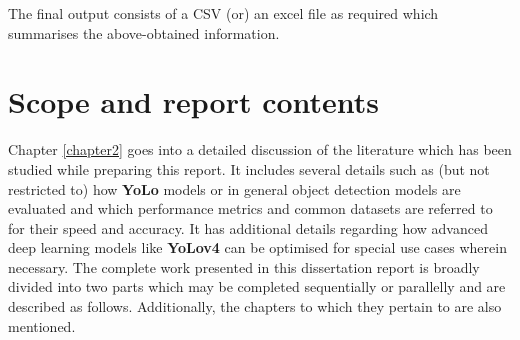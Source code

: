 The final output consists of a CSV (or) an excel file as required which summarises the above-obtained information.

\section{Scope and report contents}

Chapter \ref{chapter2} goes into a detailed discussion of the literature which has been studied while preparing this report. It includes several details such as (but not restricted to) how \textbf{YoLo} models or in general object detection models are evaluated and which performance metrics and common datasets are referred to for their speed and accuracy. It has additional details regarding how advanced deep learning models like \textbf{YoLov4} can be optimised for special use cases wherein necessary.
The complete work presented in this dissertation report is broadly divided into two parts which may be completed sequentially or parallelly and are described as follows. Additionally, the chapters to which they pertain to are also mentioned.

